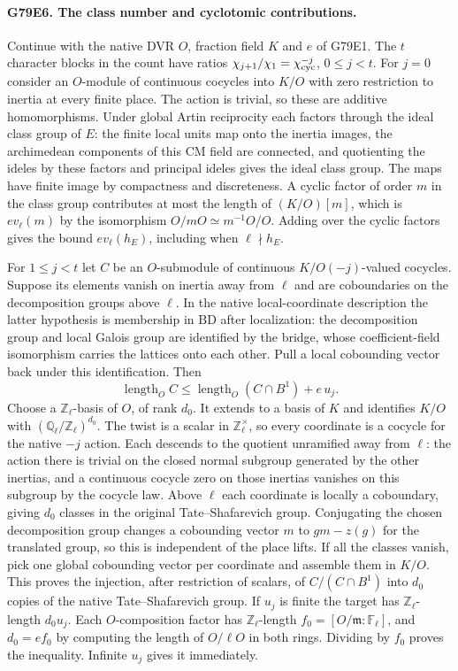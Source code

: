 \paragraph{G79E6. The class number and cyclotomic contributions.}
Continue with the native DVR $O$, fraction field $K$ and $e$ of
G79E1. The $t$ character blocks in the count have ratios
$\chi_{j+1}/\chi_1=\chi_{\rm cyc}^{-j}$, $0\le j<t$.
For $j=0$ consider an $O$-module of continuous cocycles into $K/O$
with zero restriction to inertia at every finite place. The action
is trivial, so these are additive homomorphisms. Under global Artin
reciprocity each factors through the ideal class group of $E$:
the finite local units map onto the inertia images, the archimedean
components of this CM field are connected, and quotienting the
ideles by these factors and principal ideles gives the ideal class
group. The maps have finite image by compactness and discreteness.
A cyclic factor of order $m$ in the class group contributes at most
the length of $(K/O)[m]$, which is $e v_\ell(m)$ by the
isomorphism $O/mO\simeq m^{-1}O/O$. Adding over the cyclic factors
gives the bound $e v_\ell(h_E)$, including when $\ell\nmid h_E$.

For $1\le j<t$ let $C$ be an $O$-submodule of continuous
$K/O(-j)$-valued cocycles. Suppose its elements vanish on inertia
away from $\ell$ and are coboundaries on the decomposition groups
above $\ell$. In the native local-coordinate description the latter
hypothesis is membership in $\mathrm{BD}$ after localization: the
decomposition group and local Galois group are identified by the
bridge, whose coefficient-field isomorphism carries the lattices
onto each other. Pull a local cobounding vector back under this
identification. Then
\[
 \operatorname{length}_O C\le
 \operatorname{length}_O(C\cap B^1)+e\,u_j .
\]
Choose a $\mathbb Z_\ell$-basis of $O$, of rank $d_0$.
It extends to a basis of $K$ and identifies $K/O$ with
$(\mathbb Q_\ell/\mathbb Z_\ell)^{d_0}$. The twist is a scalar
in $\mathbb Z_\ell^\times$, so every coordinate is a cocycle for
the native $-j$ action. Each descends to the quotient unramified
away from $\ell$: the action there is trivial on the closed normal
subgroup generated by the other inertias, and a continuous cocycle
zero on those inertias vanishes on this subgroup by the cocycle law.
Above $\ell$ each coordinate is locally a coboundary, giving
$d_0$ classes in the original Tate--Shafarevich group. Conjugating
the chosen decomposition group changes a cobounding vector $m$ to
$g m-z(g)$ for the translated group, so this is independent of the
place lifts. If all the classes vanish, pick one global cobounding
vector per coordinate and assemble them in $K/O$. This proves the
injection, after restriction of scalars, of $C/(C\cap B^1)$ into
$d_0$ copies of the native Tate--Shafarevich group.
If $u_j$ is finite the target has $\mathbb Z_\ell$-length $d_0u_j$.
Each $O$-composition factor has $\mathbb Z_\ell$-length
$f_0=[O/\mathfrak m:\mathbb F_\ell]$, and $d_0=e f_0$ by
computing the length of $O/\ell O$ in both rings. Dividing by
$f_0$ proves the inequality. Infinite $u_j$ gives it immediately.

